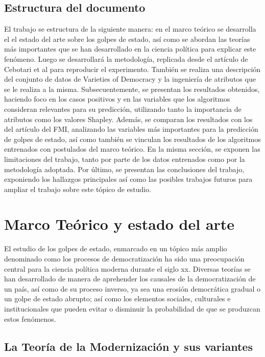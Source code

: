 \documentclass{article}
\begin{document}
\subsection{Estructura del documento}
El trabajo se estructura de la siguiente manera: en el marco teórico se desarrolla el
el estado del arte sobre los golpes de estado, así como se abordan las teorías más
importantes que se han desarrollado en la ciencia política para explicar este fenómeno.
Luego se desarrollará la metodología, replicada desde el artículo de Cebotari
et al para reproducir el experimento. También se realiza una descripción del conjunto de datos
de Varieties of Democracy y la ingeniería de atributos que se le realiza a la misma. Subsecuentemente, 
se presentan los resultados obtenidos, haciendo foco en los casos positivos y en las variables que los
algoritmos consideran relevantes para su predicción, utilizando tanto la importancia de atributos como
los valores Shapley. Además, se comparan los resultados con los del artículo del FMI,
analizando las variables más importantes para la predicción de golpes de estado, así como también se 
vinculan los resultados de los algoritmos entrenados con postulados del marco teórico. En la misma
sección, se exponen las limitaciones del trabajo, tanto por parte de los datos entrenados como
por la metodología adoptada. Por último, se presentan las conclusiones del trabajo, exponiendo los 
hallazgos principales así como las posibles trabajos futuros para ampliar el trabajo sobre este 
tópico de estudio.

\section{Marco Teórico y estado del arte}

El estudio de los golpes de estado, enmarcado en un tópico más amplio denominado
como los procesos de democratización ha sido una 
preocupación central para la ciencia política moderna durante el siglo xx. Diversas teorías
se han desarrollado de manera de aprehender los causales de la democratización
de un país, así como de su proceso inverso, ya sea una erosión democrática gradual o un
golpe de estado abrupto; así como los elementos sociales, culturales e institucionales 
que pueden evitar o disminuir la probabilidad de que se produzcan estos fenómenos.

\subsection{La Teoría de la Modernización y sus variantes}
\end{document}
